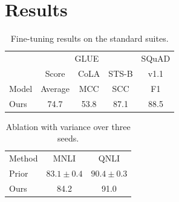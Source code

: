 \documentclass{article}
\begin{document}
\section{Results}

\begin{table}
\caption{Fine-tuning results on the standard suites.}
\begin{tabular}{lcccc}
 & \multicolumn{3}{c}{GLUE} & \multicolumn{1}{c}{SQuAD} \\
 & Score & CoLA & STS-B & v1.1 \\
Model & Average & MCC & SCC & F1 \\
\hline
Ours & 74.7 & 53.8 & 87.1 & 88.5 \\
\end{tabular}
\end{table}

\begin{table}
\caption{Ablation with variance over three seeds.}
\begin{tabular}{lcc}
Method & MNLI & QNLI \\
Prior & $83.1 \pm 0.4$ & $90.4 \pm 0.3$ \\
Ours & 84.2 & 91.0 \\
\end{tabular}
\end{table}
\end{document}

